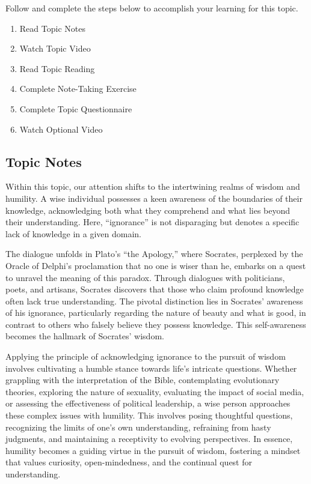 \documentclass[
]{book}
\providecommand{\tightlist}{%
  \setlength{\itemsep}{0pt}\setlength{\parskip}{0pt}}
\begin{document}
Follow and complete the steps below to accomplish your learning for this topic.

\begin{enumerate}
\def\labelenumi{\arabic{enumi}.}
\tightlist
\item
  Read Topic Notes
\item
  Watch Topic Video
\item
  Read Topic Reading
\item
  Complete Note-Taking Exercise
\item
  Complete Topic Questionnaire
\item
  Watch Optional Video
\end{enumerate}

\hypertarget{topic-notes-1}{%
\subsection*{Topic Notes}\label{topic-notes-1}}

Within this topic, our attention shifts to the intertwining realms of wisdom and humility. A wise individual possesses a keen awareness of the boundaries of their knowledge, acknowledging both what they comprehend and what lies beyond their understanding. Here, ``ignorance'' is not disparaging but denotes a specific lack of knowledge in a given domain.

The dialogue unfolds in Plato's ``the Apology,'' where Socrates, perplexed by the Oracle of Delphi's proclamation that no one is wiser than he, embarks on a quest to unravel the meaning of this paradox. Through dialogues with politicians, poets, and artisans, Socrates discovers that those who claim profound knowledge often lack true understanding. The pivotal distinction lies in Socrates' awareness of his ignorance, particularly regarding the nature of beauty and what is good, in contrast to others who falsely believe they possess knowledge. This self-awareness becomes the hallmark of Socrates' wisdom.

Applying the principle of acknowledging ignorance to the pursuit of wisdom involves cultivating a humble stance towards life's intricate questions. Whether grappling with the interpretation of the Bible, contemplating evolutionary theories, exploring the nature of sexuality, evaluating the impact of social media, or assessing the effectiveness of political leadership, a wise person approaches these complex issues with humility. This involves posing thoughtful questions, recognizing the limits of one's own understanding, refraining from hasty judgments, and maintaining a receptivity to evolving perspectives. In essence, humility becomes a guiding virtue in the pursuit of wisdom, fostering a mindset that values curiosity, open-mindedness, and the continual quest for understanding.
\end{document}
